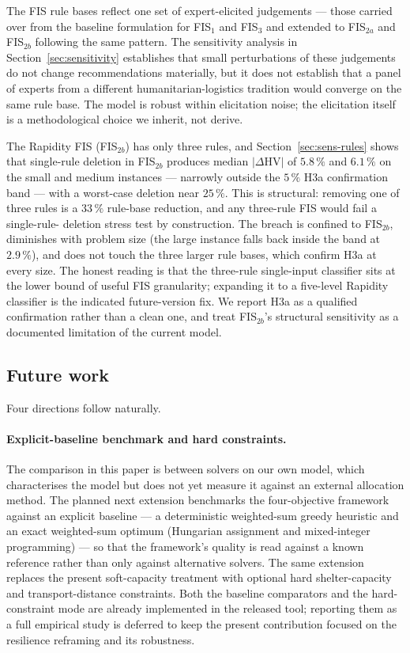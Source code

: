 \documentclass[applsci,article,submit,moreauthors,pdftex]{Definitions/mdpi}
\begin{document}
The FIS rule bases reflect one set of expert-elicited judgements ---
those carried over from the baseline formulation for FIS$_1$ and FIS$_3$ and
extended to FIS$_{2a}$ and FIS$_{2b}$ following the same pattern. The
sensitivity analysis in Section~\ref{sec:sensitivity} establishes that
small perturbations of these judgements do not change recommendations
materially, but it does not establish that a panel of experts from a
different humanitarian-logistics tradition would converge on the same
rule base. The model is robust within elicitation noise; the elicitation
itself is a methodological choice we inherit, not derive.

The Rapidity FIS (FIS$_{2b}$) has only three rules, and
Section~\ref{sec:sens-rules} shows that single-rule deletion in
FIS$_{2b}$ produces median $|\Delta\mathrm{HV}|$ of $5.8\,\%$ and
$6.1\,\%$ on the small and medium instances --- narrowly outside the
$5\,\%$ H3a confirmation band --- with a worst-case deletion near
$25\,\%$. This is structural: removing one of three rules is a $33\,\%$
rule-base reduction, and any three-rule FIS would fail a single-rule-
deletion stress test by construction. The breach is confined to
FIS$_{2b}$, diminishes with problem size (the large instance falls
back inside the band at $2.9\,\%$), and does not touch the three
larger rule bases, which confirm H3a at every size. The honest reading
is that the three-rule single-input classifier sits at the lower bound
of useful FIS granularity; expanding it to a five-level Rapidity
classifier is the indicated future-version fix. We report H3a as a
qualified confirmation rather than a clean one, and treat FIS$_{2b}$'s
structural sensitivity as a documented limitation of the current
model.

\subsection{Future work}\label{sec:disc-future}

Four directions follow naturally.

\paragraph{Explicit-baseline benchmark and hard constraints.}
The comparison in this paper is between solvers on our own model, which
characterises the model but does not yet measure it against an external
allocation method. The planned next extension benchmarks the four-objective
framework against an explicit baseline --- a deterministic weighted-sum greedy
heuristic and an exact weighted-sum optimum (Hungarian assignment and
mixed-integer programming) --- so that the framework's quality is read against a
known reference rather than only against alternative solvers. The same extension
replaces the present soft-capacity treatment with optional hard shelter-capacity
and transport-distance constraints. Both the baseline comparators and the
hard-constraint mode are already implemented in the released tool; reporting them
as a full empirical study is deferred to keep the present contribution focused on
the resilience reframing and its robustness.
\end{document}
